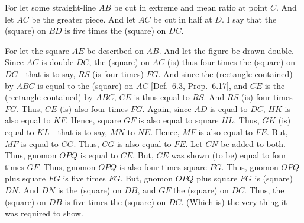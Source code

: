 \begin{Parallel}{}{}
{For let some straight-line $AB$ be cut in extreme and mean ratio
at point $C$. And let $AC$ be the greater piece. And let $AC$ be
cut in half at $D$. I say that the (square) on $BD$ is five times the
(square) on $DC$. 

For let the square $AE$ be described on $AB$. And let the
figure be drawn double. Since $AC$ is double $DC$, the
(square) on $AC$ (is) thus four times the (square) on $DC$---that
is to say, $RS$ (is four times) $FG$. And since the (rectangle contained)
by $ABC$ is equal to the (square) on $AC$ [Def.~6.3, Prop.~6.17],
and $CE$ is the (rectangle contained) by $ABC$,  $CE$ is thus equal
to $RS$. And $RS$ (is) four times $FG$. Thus, $CE$ (is) also four times
$FG$. Again, since $AD$ is equal to $DC$, $HK$ is also equal to
$KF$. Hence, square $GF$ is also equal to square $HL$. Thus,
$GK$ (is) equal to $KL$---that is to say, $MN$ to $NE$. 
Hence, $MF$ is also equal to $FE$. But, $MF$ is equal to $CG$.
Thus, $CG$ is also equal to $FE$. Let $CN$ be added to both.
Thus, gnomon $OPQ$ is equal to $CE$. But, $CE$ was shown (to be)
equal to four times $GF$. Thus, gnomon $OPQ$  is also four times
square $FG$. Thus, gnomon $OPQ$ plus square $FG$ is five times
$FG$. But, gnomon $OPQ$ plus square $FG$ is (square) $DN$. 
And  $DN$ is the (square) on $DB$, and $GF$ the (square)
on $DC$. Thus, the (square) on $DB$ is five times the (square)
on $DC$. (Which is) the very thing it was required to show.}
\end{Parallel}

